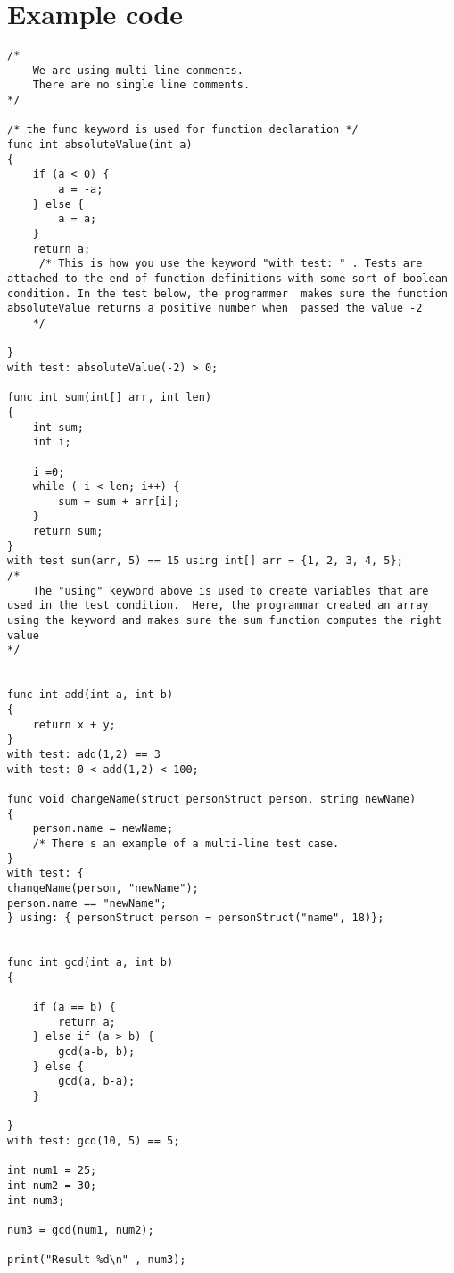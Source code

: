 \documentclass{article}
\begin{document}
\section{Example code}
\begin{lstlisting}
/*
	We are using multi-line comments.
	There are no single line comments.
*/

/* the func keyword is used for function declaration */
func int absoluteValue(int a)
{
	if (a < 0) {
		a = -a;
	} else {
		a = a;
	}
	return a;
	 /* This is how you use the keyword "with test: " . Tests are attached to the end of function definitions with some sort of boolean condition. In the test below, the programmer  makes sure the function absoluteValue returns a positive number when  passed the value -2
	*/

}
with test: absoluteValue(-2) > 0;

func int sum(int[] arr, int len)
{
	int sum;
	int i;
	
	i =0;
	while ( i < len; i++) {
		sum = sum + arr[i];
	}
	return sum;
}
with test sum(arr, 5) == 15 using int[] arr = {1, 2, 3, 4, 5};
/*
	The "using" keyword above is used to create variables that are used in the test condition.  Here, the programmar created an array using the keyword and makes sure the sum function computes the right value
*/


func int add(int a, int b)
{
	return x + y;
}
with test: add(1,2) == 3
with test: 0 < add(1,2) < 100;

func void changeName(struct personStruct person, string newName)
{
	person.name = newName;
	/* There's an example of a multi-line test case. 
}
with test: {
changeName(person, "newName");
person.name == "newName";
} using: { personStruct person = personStruct("name", 18)};


func int gcd(int a, int b)
{

	if (a == b) {
		return a;
	} else if (a > b) {
		gcd(a-b, b);
	} else {
		gcd(a, b-a);
	}

}
with test: gcd(10, 5) == 5;

int num1 = 25;
int num2 = 30;
int num3;

num3 = gcd(num1, num2);

print("Result %d\n" , num3);

\end{lstlisting}
\end{document}
